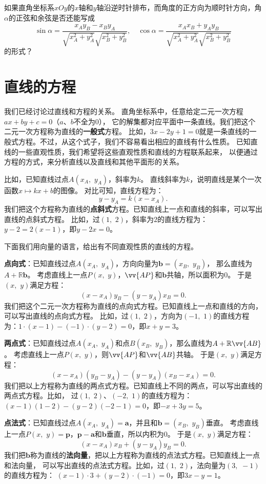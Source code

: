 \documentclass[12pt,UTF8,fontset=none]{ctexbook}
\begin{document}
\begin{sk}
    如果直角坐标系$xOy$的$x$轴和$y$轴沿逆时针排布，而角度的正方向为顺时针方向，角$\alpha$的正弦和余弦是否还能写成
    $$ \sin \alpha = \frac{x_Ay_B - x_By_A}{\sqrt{x_A^2 + y_A^2}\sqrt{x_B^2 + y_B^2}}, \quad \cos \alpha = \frac{x_Ax_B + y_Ay_B}{\sqrt{x_A^2 + y_A^2} \sqrt{x_B^2 + y_B^2}}$$
    的形式？
\end{sk}

\section{直线的方程}
我们已经讨论过直线和方程的关系。
直角坐标系中，任意给定二元一次方程$ax + by + c = 0$（$a$、$b$不全为$0$），
它的解集都对应平面中一条直线。我们把这个二元一次方程称为直线的\textbf{一般式}方程。
比如，$3x - 2y + 1 = 0$就是一条直线的一般式方程。不过，从这个式子，我们不容易看出相应的直线有什么性质。
已知直线的一些直观性质，我们希望将这些直观性质和直线的方程联系起来，
以便通过方程的方式，来分析直线以及直线和其他平面形的关系。

比如，已知直线过点$A(x_A,\,\, y_A)$，斜率为$k$。
直线斜率为$k$，说明直线是某个一次函数$x \mapsto kx + b$的图像。
对比可知，直线方程为：
$$y - y_A = k(x - x_A).$$
我们把这个方程称为直线的\textbf{点斜式}方程。已知直线上一点和直线的斜率，可以写出直线的点斜式方程。
比如，过$(1,\,\,2)$，斜率为$2$的直线方程为：$y - 2 = 2(x - 1)$，即$y - 2x = 0$。

下面我们用向量的语言，给出有不同直观性质的直线的方程。

\textbf{点向式}：已知直线过点$A(x_A,\,\, y_A)$，方向向量为$\mathbf{b} = (x_B,\,\, y_B)$，
那么直线为$A + \mathbb{R}\mathbf{b}$。
考虑直线上一点$P(x,\,\, y)$，$\vv{AP}$和$\mathbf{b}$共轴，所以面积为$0$。
于是$(x,\,\,y)$满足方程：
$$(x - x_A) y_B - (y - y_A) x_B = 0.$$
我们把这个二元一次方程称为直线的点向式方程。已知直线上一点和直线的方向，可以写出直线的点向式方程。
比如，过$(1,\,\,2)$，方向为$(-1,\,\,1)$的直线方程为：$1\cdot(x - 1) - (-1)\cdot(y - 2) = 0$，即$x + y = 3$。

\textbf{两点式}：已知直线过点$A(x_A,\,\, y_A)$和点$B(x_B,\,\, y_B)$，那么直线为$A + \mathbb{R}\vv{AB}$。
考虑直线上一点$P(x,\,\, y)$，则$\vv{AP}$和$\vv{AB}$共轴。
于是$(x,\,\,y)$满足方程：
$$(x - x_A) (y_B - y_A) - (y - y_A) (x_B - x_A) = 0.$$
我们把以上方程称为直线的两点式方程。已知直线上不同的两点，可以写出直线的两点式方程。比如，
过$(1,\,\,2)$、$(-2,\,\,1)$的直线方程为：$(x - 1)(1 - 2) - (y - 2)(-2 - 1) = 0$，即$-x + 3y = 5$。

\textbf{点法式}：已知直线过点$A(x_A,\,\, y_A) = \mathbf{a}$，并且和$\mathbf{b} = (x_B,\,\, y_B)$垂直。
考虑直线上一点$P(x,\,\, y) = \mathbf{p}$，$\mathbf{p} - \mathbf{a}$和$\mathbf{b}$垂直，所以内积为$0$。
于是$(x,\,\,y)$满足方程：
$$(x - x_A) x_B + (y - y_A) y_B = 0.$$
我们把$\mathbf{b}$称为直线的\textbf{法向量}，把以上方程称为直线的点法式方程。已知直线上一点和法向量，
可以写出直线的点法式方程。比如，过$(1,\,\,2)$，法向量为$(3,\,\,-1)$的直线方程为：
$(x - 1)\cdot 3 + (y - 2)\cdot (-1) = 0$，即$3x - y= 1$。
\end{document}
